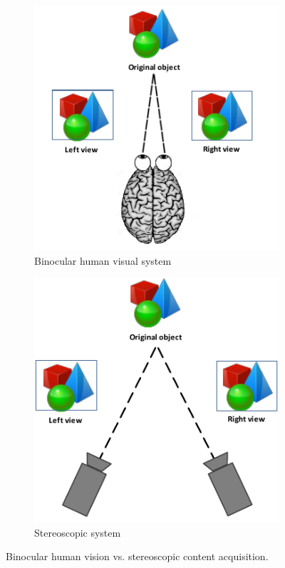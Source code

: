 \begin{figure}[h]
\centering
\begin{subfigure}[b]{0.35\textwidth}
        \includegraphics[width=\textwidth]{./img/hvs.png}
         \caption{\scriptsize{Binocular human visual system}}
         \label{fig:hvs}
\end{subfigure}
\begin{subfigure}[b]{0.35\textwidth}
        \includegraphics[width=\textwidth]{./img/stereo.png}
        \caption{\scriptsize{Stereoscopic system}}
        \label{fig:stereo}
\end{subfigure} 
\caption{\small{Binocular human vision vs. stereoscopic content acquisition.}}
\end{figure}

